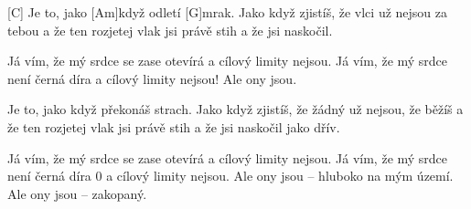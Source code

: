
[C] Je to, jako [Am]když odletí [G]mrak. 
Jako když zjistíš, že vlci už nejsou 
za tebou a že ten rozjetej vlak 
jsi právě stih a že jsi naskočil. 

Já vím, že mý srdce se zase otevírá 
a cílový limity nejsou. 
Já vím, že mý srdce není černá díra
a cílový limity nejsou! Ale ony jsou. 

Je to, jako když překonáš strach. 
Jako když zjistíš, že žádný už nejsou, 
že běžíš a že ten rozjetej vlak jsi právě stih 
a že jsi naskočil jako dřív. 

Já vím, že mý srdce se zase otevírá 
a cílový limity nejsou. 
Já vím, že mý srdce není černá díra 0
a cílový limity nejsou. 
Ale ony jsou – hluboko na mým území. 
Ale ony jsou – zakopaný.
